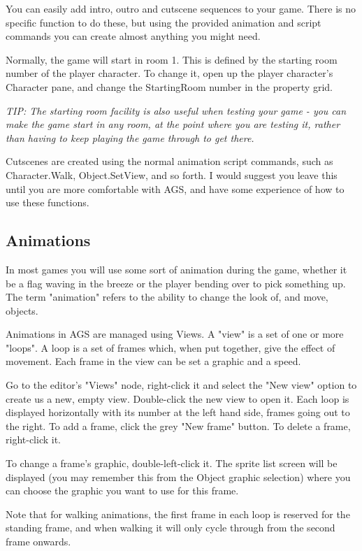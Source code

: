 You can easily add intro, outro and cutscene sequences to your game. There
is no specific function to do these, but using the provided animation and
script commands you can create almost anything you might need.

Normally, the game will start in room 1. This is defined by the starting room
number of the player character. To change it, open up the player character's
Character pane, and change the StartingRoom number in the property grid.

\it{TIP: The starting room facility is also useful when testing your game - you
can make the game start in any room, at the point where you are testing it,
rather than having to keep playing the game through to get there.}

Cutscenes are created using the normal animation script commands, such as
Character.Walk, Object.SetView, and so forth. I would suggest you leave this
until you are more comfortable with AGS, and have some experience of how
to use these functions.

\subsection{Animations}\label{Views}%

In most games you will use some sort of animation during the game, whether
it be a flag waving in the breeze or the player bending over to pick something
up. The term "animation" refers to the ability to change the look of, and
move, objects.

Animations in AGS are managed using Views. A "view" is a set of one or more
"loops". A loop is a set of frames which, when put together, give the effect
of movement. Each frame in the view can be set a graphic and a speed.

Go to the editor's "Views" node, right-click it and select the "New view"
option to create us a new, empty view. Double-click the new view to open it.
Each loop is displayed horizontally with its number at the left hand side,
frames going out to the right. To add a frame, click the grey "New frame"
button. To delete a frame, right-click it.

To change a frame's graphic, double-left-click it. The sprite list screen
will be displayed (you may remember this from the Object graphic selection)
where you can choose the graphic you want to use for this frame.

Note that for walking animations, the first frame in each loop is reserved for
the standing frame, and when walking it will only cycle through from the second
frame onwards.

